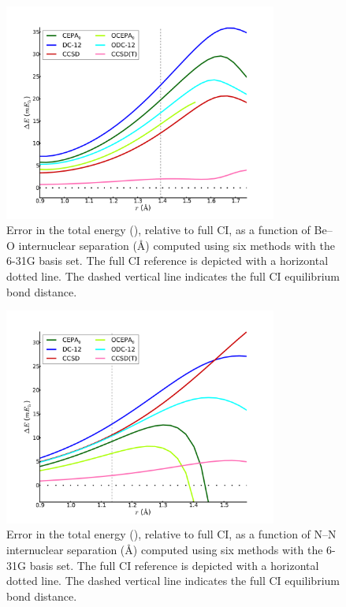 \begin{figure}
	\centering
	\caption{%
        \label{beo-f}
        Error in the total energy (\mhartree), relative to full CI, as a
        function of Be--O internuclear separation (\AA) computed using six
        methods with the 6-31G basis set.
        The full CI reference is depicted with a horizontal dotted line.
        The dashed vertical line indicates the full CI equilibrium bond
        distance.
	}
	\includegraphics[width=0.8\textwidth]{figures/beo.pdf}
\end{figure}

\begin{figure}
	\centering
	\caption{%
        \label{n2-f}
        Error in the total energy (\mhartree), relative to full CI, as a
        function of N--N internuclear separation (\AA) computed using six
        methods with the 6-31G basis set.
        The full CI reference is depicted with a horizontal dotted line.
        The dashed vertical line indicates the full CI equilibrium bond
        distance.
	}
	\includegraphics[width=0.8\textwidth]{figures/n2.pdf}
\end{figure}




